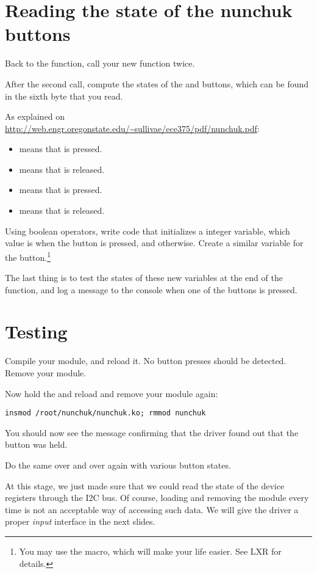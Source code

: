 \section{Reading the state of the nunchuk buttons}

Back to the  function, call your new function twice.

After the second call, compute the states of the  and 
buttons, which can be found in the sixth byte that you read.

As explained on
\url{http://web.engr.oregonstate.edu/~sullivae/ece375/pdf/nunchuk.pdf}:

\begin{itemize}
\item {} means that  is pressed. 
\item {} means that  is released. 
\item {} means that  is pressed. 
\item {} means that  is released. 
\end{itemize}

Using boolean operators, write code that initializes a 
integer variable, which value is  when the  button is
pressed, and  otherwise. Create a similar 
variable for the  button.\footnote{You may use the 
macro, which will make your life easier. See LXR for details.}

The last thing is to test the states of these new variables at the end
of the  function, and log a message to the console
when one of the buttons is pressed.

\section{Testing}

Compile your module, and reload it. No button presses should be
detected. Remove your module.

Now hold the  and reload and remove your module again:
\begin{verbatim}
insmod /root/nunchuk/nunchuk.ko; rmmod nunchuk
\end{verbatim}

You should now see the message confirming that the driver found
out that the  button was held.

Do the same over and over again with various button states.

At this stage, we just made sure that we could read the state
of the device registers through the I2C bus. Of course, loading and
removing the module every time is not an acceptable way of 
accessing such data. We will give the driver a proper {\em input}
interface in the next slides.
